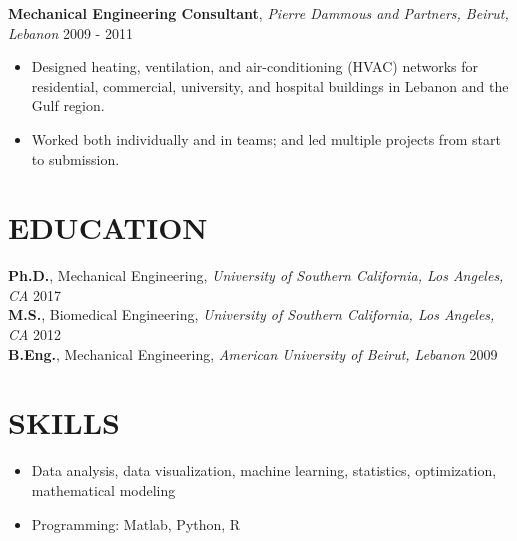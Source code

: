 \documentclass[11pt]{res-modified}
\begin{document}
\begin{resume}
{\bf Mechanical Engineering Consultant}, \textit{Pierre Dammous and Partners, Beirut, Lebanon} \hfill 2009 - 2011
\begin{itemize}
\item Designed heating, ventilation, and air-conditioning (HVAC) networks for residential, commercial, university, and hospital buildings in Lebanon and the Gulf region.
\item Worked both individually and in teams; and led multiple projects from start to submission.
\end{itemize}


\section{EDUCATION}
\vspace{1mm}
\textbf{Ph.D.}, Mechanical Engineering, \textit{University of Southern California, Los Angeles, CA}  \hfill 2017\\
\textbf{M.S.}, Biomedical Engineering, \textit{University of Southern California, Los Angeles, CA} \hfill 2012\\
\textbf{B.Eng.}, Mechanical Engineering, \textit{American University of Beirut, Lebanon} \hfill 2009


\section{SKILLS}
\vspace{5mm}
\begin{itemize}
\item Data analysis, data visualization, machine learning, statistics, optimization, mathematical modeling
\item Programming: Matlab, Python, R
\end{itemize}


\end{resume}
\end{document}
